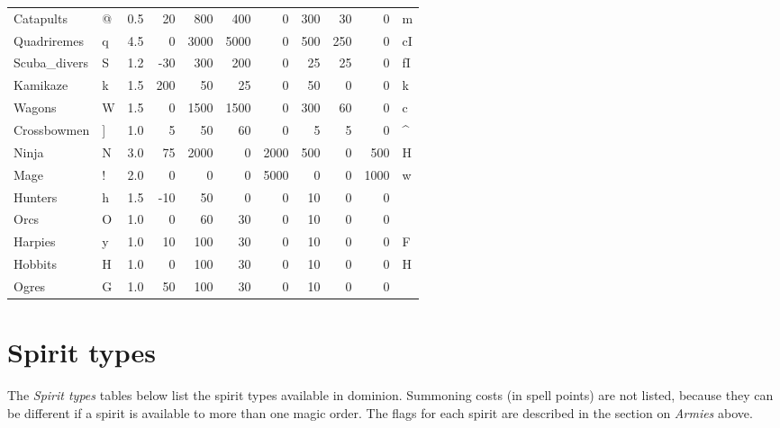 \begin{same}
\begin{table}[hbpt]
\begin{tabular}{ || l | l | r | r | r | r | r | r | r | r | l || }
Catapults    &@& 0.5&  20 & 800 & 400 &   0 & 300 &  30 &   0 &m\\
Quadriremes  &q& 4.5&   0 &3000 &5000 &   0 & 500 & 250 &   0 &cI\\
Scuba_divers &S& 1.2& -30 & 300 & 200 &   0 &  25 &  25 &   0 &fI\\
Kamikaze     &k& 1.5& 200 &  50 &  25 &   0 &  50 &   0 &   0 &k\\
Wagons       &W& 1.5&   0 &1500 &1500 &   0 & 300 &  60 &   0 &c\\
Crossbowmen  &]& 1.0&   5 &  50 &  60 &   0 &   5 &   5 &   0 &^\\
Ninja        &N& 3.0&  75 &2000 &   0 &2000 & 500 &   0 & 500 &H\\
Mage         &!& 2.0&   0 &   0 &   0 &5000 &   0 &   0 &1000 &w\\
Hunters      &h& 1.5& -10 &  50 &   0 &   0 &  10 &   0 &   0 &\\
Orcs         &O& 1.0&   0 &  60 &  30 &   0 &  10 &   0 &   0 &\\
Harpies      &y& 1.0&  10 & 100 &  30 &   0 &  10 &   0 &   0 &F\\
Hobbits      &H& 1.0&   0 & 100 &  30 &   0 &  10 &   0 &   0 &H\\
Ogres        &G& 1.0&  50 & 100 &  30 &   0 &  10 &   0 &   0 &\\
\hline
\end{tabular}
\end{table}
\end{same}

\section{Spirit types}
The \emph{Spirit types} tables below list the spirit types available in
dominion.  Summoning costs (in spell points) are not listed, because
they can be different if a spirit is available to more than one magic
order.  The flags for each spirit are described in the section on
\emph{Armies} above.


